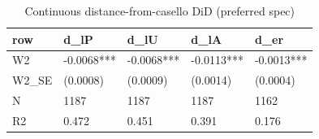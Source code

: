 \begin{table}

\caption{Continuous distance-from-casello DiD (preferred spec)}
\centering
\begin{tabular}[t]{lllll}
\toprule
row & d\_lP & d\_lU & d\_lA & d\_er\\
\midrule
W2 & -0.0068*** & -0.0068*** & -0.0113*** & -0.0013***\\
W2\_SE & (0.0008) & (0.0009) & (0.0014) & (0.0004)\\
N & 1187 & 1187 & 1187 & 1162\\
R2 & 0.472 & 0.451 & 0.391 & 0.176\\
\bottomrule
\end{tabular}
\end{table}
